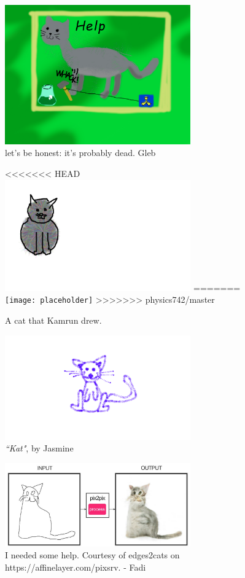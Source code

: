 \begin{centering}
\begin{figure}
	\includegraphics[width=8cm]{cat-gleb.pdf}
  \caption{let's be honest: it's probably dead. Gleb }
  \label{fig:cat_gleb}
\end{figure}



\begin{figure}
<<<<<<< HEAD
	\includegraphics[width=8cm]{Cat742afer228.pdf}
=======
	\texttt{[image: placeholder]}
>>>>>>> physics742/master
  \caption{A cat that Kamrun drew.}
  \label{Cat draw by Kamrun}
\end{figure}




\begin{figure} \centering
    \includegraphics[width=8cm]{kat.pdf}
    \caption{\emph{``Kat"}, by Jasmine}
    \label{kat}
\end{figure}


\begin{figure}\centering
  \includegraphics[width=8cm]{cat-fadiwassaf.pdf}
  \caption{I needed some help. Courtesy of edges2cats on https://affinelayer.com/pixsrv. - Fadi}
  \label{cat-fadi}
\end{figure}




\end{centering}
